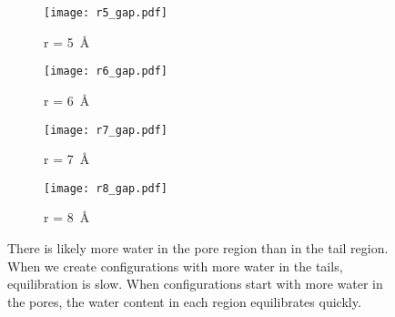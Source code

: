   \begin{figure}[!htb]
  \centering
  \begin{subfigure}{0.45\textwidth}
  \texttt{[image: r5\_gap.pdf]}
  \caption{r = 5~\AA}\label{S-fig:r5_gap}
  \end{subfigure}
  \begin{subfigure}{0.45\textwidth}
  \texttt{[image: r6\_gap.pdf]}
  \caption{r = 6~\AA}\label{S-fig:r6_gap}
  \end{subfigure}
  \begin{subfigure}{0.45\textwidth}
  \texttt{[image: r7\_gap.pdf]}
  \caption{r = 7~\AA}\label{S-fig:r7_gap}
  \end{subfigure}
  \begin{subfigure}{0.45\textwidth}
  \texttt{[image: r8\_gap.pdf]}
  \caption{r = 8~\AA}\label{S-fig:r8_gap}
  \end{subfigure}
  \caption{There is likely more water in the pore region than in the tail region.
  When we create configurations with more water in the tails, equilibration is 
  slow. When configurations start with more water in the pores, the water content
  in each region equilibrates quickly.}\label{S-fig:gap_prefilled_equil}
  \end{figure}

